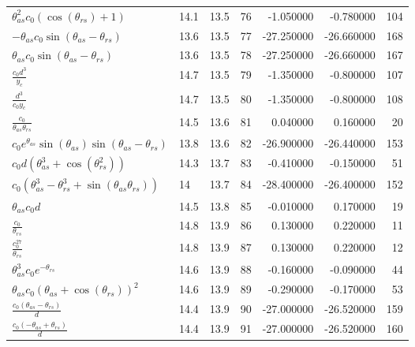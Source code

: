 \begin{tabularx}{\textwidth}{lllrrrr}
$ \theta_{as}^{2} c_{0} \left(\cos{\left(\theta_{rs} \right)} + 1\right) $  &  14.1  &  13.5  &  76  &  -1.050000  &  -0.780000  &  104  \\ 
$ - \theta_{as} c_{0} \sin{\left(\theta_{as} - \theta_{rs} \right)} $  &  13.6  &  13.5  &  77  &  -27.250000  &  -26.660000  &  168  \\ 
$ \theta_{as} c_{0} \sin{\left(\theta_{as} - \theta_{rs} \right)} $  &  13.6  &  13.5  &  78  &  -27.250000  &  -26.660000  &  167  \\ 
$ \displaystyle\frac{c_{0} d^{3}}{y_c} $  &  14.7  &  13.5  &  79  &  -1.350000  &  -0.800000  &  107  \\ 
$ \displaystyle\frac{d^{3}}{c_{0} y_c} $  &  14.7  &  13.5  &  80  &  -1.350000  &  -0.800000  &  108  \\ 
$ \displaystyle\frac{c_{0}}{\theta_{as} \theta_{rs}} $  &  14.5  &  13.6  &  81  &  0.040000  &  0.160000  &  20  \\ 
$ c_{0} e^{\theta_{as}} \sin{\left(\theta_{as} \right)} \sin{\left(\theta_{as} - \theta_{rs} \right)} $  &  13.8  &  13.6  &  82  &  -26.900000  &  -26.440000  &  153  \\ 
$ c_{0} d \left(\theta_{as}^{3} + \cos{\left(\theta_{rs}^{2} \right)}\right) $  &  14.3  &  13.7  &  83  &  -0.410000  &  -0.150000  &  51  \\ 
$ c_{0} \left(\theta_{as}^{3} - \theta_{rs}^{3} + \sin{\left(\theta_{as} \theta_{rs} \right)}\right) $  &  14\phantom{.0}  &  13.7  &  84  &  -28.400000  &  -26.400000  &  152  \\ 
$ \theta_{as} c_{0} d $  &  14.5  &  13.8  &  85  &  -0.010000  &  0.170000  &  19  \\ 
$ \displaystyle\frac{c_{0}}{\theta_{rs}} $  &  14.8  &  13.9  &  86  &  0.130000  &  0.220000  &  11  \\ 
$ \displaystyle\frac{c_{0}^{27}}{\theta_{rs}} $  &  14.8  &  13.9  &  87  &  0.130000  &  0.220000  &  12  \\ 
$ \theta_{as}^{3} c_{0} e^{- \theta_{rs}} $  &  14.6  &  13.9  &  88  &  -0.160000  &  -0.090000  &  44  \\ 
$ \theta_{as} c_{0} \left(\theta_{as} + \cos{\left(\theta_{rs} \right)}\right)^{2} $  &  14.6  &  13.9  &  89  &  -0.290000  &  -0.170000  &  53  \\ 
$ \displaystyle\frac{c_{0} \left(\theta_{as} - \theta_{rs}\right)}{d} $  &  14.4  &  13.9  &  90  &  -27.000000  &  -26.520000  &  159  \\ 
$ \displaystyle\frac{c_{0} \left(- \theta_{as} + \theta_{rs}\right)}{d} $  &  14.4  &  13.9  &  91  &  -27.000000  &  -26.520000  &  160  \\ 

\end{tabularx}
